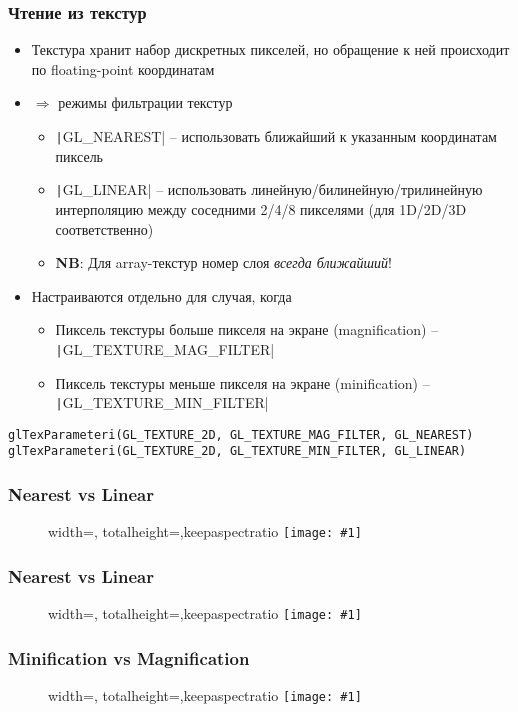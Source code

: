 \documentclass[10pt]{beamer}
\newcommand{\slideimage}[1]{
  \begin{figure}
    \begin{adjustbox}{width=\textwidth, totalheight=\textheight-2\baselineskip-2\baselineskip,keepaspectratio}
      \texttt{[image: \#1]}
    \end{adjustbox}
  \end{figure}
}
\begin{document}
\begin{frame}[fragile]
\frametitle{Чтение из текстур}
\begin{itemize}
\item Текстура хранит набор дискретных пикселей, но обращение к ней происходит по floating-point координатам
\pause
\item \begin{math}\Rightarrow\end{math} режимы фильтрации текстур
\begin{itemize}
\item \texttt|GL_NEAREST| -- использовать ближайший к указанным координатам пиксель
\item \texttt|GL_LINEAR| -- использовать линейную/билинейную/трилинейную интерполяцию между соседними 2/4/8 пикселями (для 1D/2D/3D соответственно)
\item \textbf{\alert{NB}}: Для array-текстур номер слоя \textit{всегда ближайший}!
\end{itemize}
\pause
\item Настраиваются отдельно для случая, когда
\begin{itemize}
\item Пиксель текстуры больше пикселя на экране (magnification) -- \texttt|GL_TEXTURE_MAG_FILTER|
\item Пиксель текстуры меньше пикселя на экране (minification) -- \texttt|GL_TEXTURE_MIN_FILTER|
\end{itemize}
\end{itemize}
\pause
{}
\begin{verbatim}
glTexParameteri(GL_TEXTURE_2D, GL_TEXTURE_MAG_FILTER, GL_NEAREST)
glTexParameteri(GL_TEXTURE_2D, GL_TEXTURE_MIN_FILTER, GL_LINEAR)
\end{verbatim}
\end{frame}

\begin{frame}
\frametitle{Nearest vs Linear}
\slideimage{pikachu.png}
\end{frame}

\begin{frame}
\frametitle{Nearest vs Linear}
\slideimage{nearest_linear.png}
\end{frame}

\begin{frame}
\frametitle{Minification vs Magnification}
\slideimage{earth.png}
\end{frame}
\end{document}
